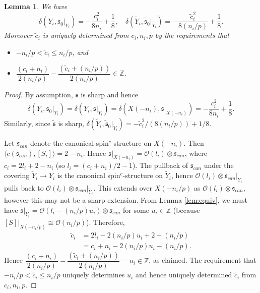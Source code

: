 \documentclass{amsart}
\newtheorem{lemma}[theorem]{Lemma}
\theoremstyle{definition}
\theoremstyle{remark}
\numberwithin{equation}{section}
\begin{document}
\begin{lemma}\label{lem:deltaY}
We have
\[
\delta( Y_i , \mathfrak{s}_0|_{Y_i}) = -\frac{c_i^2}{8n_i} + \frac{1}{8}, \quad \delta( \widetilde{Y}_i , \widetilde{\mathfrak{s}}_0 |_{\widetilde{Y}_i}) = -\frac{ \widetilde{c}_i^2}{8(n_i/p)} + \frac{1}{8}.
\]
Moreover $\widetilde{c}_i$ is uniquely determined from $c_i,n_i,p$ by the requirements that 
\begin{itemize}
\item[(1)]{$-n_i/p < \widetilde{c}_i \le n_i/p$, and}
\item[(2)]{$ \dfrac{(c_i+n_i)}{2(n_i/p)} - \dfrac{(\widetilde{c}_i + (n_i/p))}{2(n_i/p)} \in \mathbb{Z}.$ }
\end{itemize}
\end{lemma}

\begin{proof}
By assumption, $\mathfrak{s}$ is sharp and hence
\[
\delta(Y_i , \mathfrak{s}_0 |_{Y_i}) = \delta(Y_i , \mathfrak{s}|_{Y_i}) = \delta( X(-n_i) , \mathfrak{s}|_{X(-n_i)}) = -\frac{c_i^2}{8n_i} + \frac{1}{8}.
\]
Similarly, since $\widetilde{\mathfrak{s}}$ is sharp, $\delta( \widetilde{Y}_i , \widetilde{\mathfrak{s}}_0 |_{\widetilde{Y}_i}) = -\widetilde{c}_i^2/(8(n_i/p)) +1/8$. 

Let $\mathfrak{s}_{can}$ denote the canonical spin$^c$-structure on $X(-n_i)$. Then $\langle c(\mathfrak{s}_{can}) , [S_i] \rangle = 2-n_i$. Hence $\mathfrak{s}|_{X(-n_i)} = \mathcal{O}(l_i) \otimes \mathfrak{s}_{can}$, where $c_i = 2l_i + 2 - n_i$ (so $l_i = (c_i + n_i)/2 - 1$). The pullback of $\mathfrak{s}_{can}$ under the covering $\widetilde{Y}_i \to Y_i$ is the canonical spin$^c$-structure on $\widetilde{Y}_i$, hence $\mathcal{O}(l_i) \otimes \mathfrak{s}_{can} |_{Y_i}$ pulls back to $\mathcal{O}(l_i) \otimes \mathfrak{s}_{can} |_{\widetilde{Y}_i}$. This extends over $X(-n_i/p)$ as $\mathcal{O}(l_i) \otimes \mathfrak{s}_{can}$, however this may not be a sharp extension. From Lemma \ref{lem:equiv}, we must have $\widetilde{\mathfrak{s}}|_{\widetilde{Y}_i} = \mathcal{O}(l_i - (n_i/p)u_i) \otimes \mathfrak{s}_{can}$ for some $u_i \in \mathbb{Z}$ (because $[S]|_{X(-n_i/p)} \cong \mathcal{O}(n_i/p)$). Therefore,
\begin{align*}
\widetilde{c}_i &= 2l_i - 2 (n_i/p) u_i + 2 - (n_i/p) \\
&= c_i + n_i - 2 (n_i/p) u_i - (n_i/p).
\end{align*}
Hence $ \dfrac{(c_i+n_i)}{2(n_i/p)} - \dfrac{(\widetilde{c}_i + (n_i/p))}{2(n_i/p)} = u_i \in \mathbb{Z}$, as claimed. The requirement that $-n_i/p < \widetilde{c}_i \le n_i/p$ uniquely determines $u_i$ and hence uniquely determined $\widetilde{c}_i$ from $c_i,n_i,p$.
\end{proof}
\end{document}
